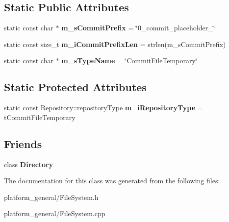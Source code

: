 \subsection*{\-Static \-Public \-Attributes}
\begin{DoxyCompactItemize}
\item 
\hypertarget{classgeneral__server_1_1CommitFileTemporary_abbcb8459f6a37e2add590f3337a8e251}{static const char $\ast$ {\bfseries m\-\_\-s\-Commit\-Prefix} = \char`\"{}0\-\_\-commit\-\_\-placeholder\-\_\-\char`\"{}}\label{classgeneral__server_1_1CommitFileTemporary_abbcb8459f6a37e2add590f3337a8e251}

\item 
\hypertarget{classgeneral__server_1_1CommitFileTemporary_a456147603ec75f9425ad06e24248bc8d}{static const size\-\_\-t {\bfseries m\-\_\-i\-Commit\-Prefix\-Len} = strlen(m\-\_\-s\-Commit\-Prefix)}\label{classgeneral__server_1_1CommitFileTemporary_a456147603ec75f9425ad06e24248bc8d}

\item 
\hypertarget{classgeneral__server_1_1CommitFileTemporary_a5b2628c17c55ee98069d500132ba80b3}{static const char $\ast$ {\bfseries m\-\_\-s\-Type\-Name} = \char`\"{}\-Commit\-File\-Temporary\char`\"{}}\label{classgeneral__server_1_1CommitFileTemporary_a5b2628c17c55ee98069d500132ba80b3}

\end{DoxyCompactItemize}
\subsection*{\-Static \-Protected \-Attributes}
\begin{DoxyCompactItemize}
\item 
\hypertarget{classgeneral__server_1_1CommitFileTemporary_ab0f41257a3f5e4d5c13f779f538092bf}{static const \*
\-Repository\-::repository\-Type {\bfseries m\-\_\-i\-Repository\-Type} = t\-Commit\-File\-Temporary}\label{classgeneral__server_1_1CommitFileTemporary_ab0f41257a3f5e4d5c13f779f538092bf}

\end{DoxyCompactItemize}
\subsection*{\-Friends}
\begin{DoxyCompactItemize}
\item 
\hypertarget{classgeneral__server_1_1CommitFileTemporary_a245303e8660be5fb8eb2828a8c44b773}{class {\bfseries \-Directory}}\label{classgeneral__server_1_1CommitFileTemporary_a245303e8660be5fb8eb2828a8c44b773}

\end{DoxyCompactItemize}


\-The documentation for this class was generated from the following files\-:\begin{DoxyCompactItemize}
\item 
platform\-\_\-general/\-File\-System.\-h\item 
platform\-\_\-general/\-File\-System.\-cpp\end{DoxyCompactItemize}

